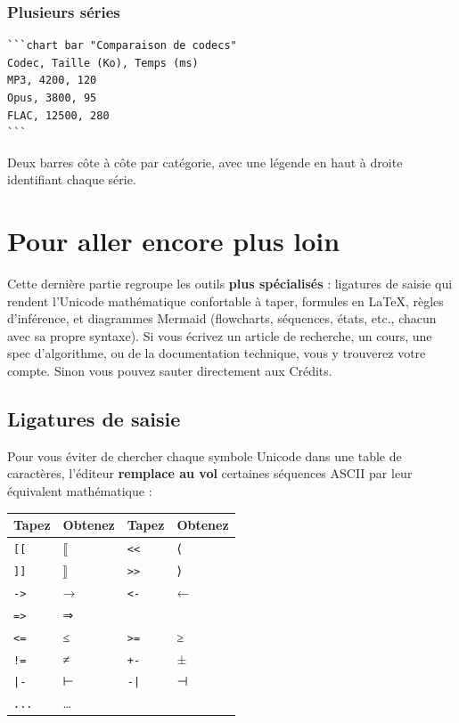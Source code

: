 \documentclass[11pt,a4paper]{article}
\theoremstyle{definition}
\begin{document}
\subsubsection{Plusieurs séries}

\begin{lstlisting}
```chart bar "Comparaison de codecs"
Codec, Taille (Ko), Temps (ms)
MP3, 4200, 120
Opus, 3800, 95
FLAC, 12500, 280
```
\end{lstlisting}


Deux barres côte à côte par catégorie, avec une légende en haut à
droite identifiant chaque série.



\noindent\hrulefill\par


\section{Pour aller encore plus loin}

Cette dernière partie regroupe les outils \textbf{plus spécialisés} :
ligatures de saisie qui rendent l'Unicode mathématique confortable à
taper, formules en LaTeX, règles d'inférence, et diagrammes Mermaid
(flowcharts, séquences, états, etc., chacun avec sa propre syntaxe).
Si vous écrivez un article de recherche, un cours, une spec
d'algorithme, ou de la documentation technique, vous y trouverez votre
compte. Sinon vous pouvez sauter directement aux Crédits.


\subsection{Ligatures de saisie}

Pour vous éviter de chercher chaque symbole Unicode dans une table de
caractères, l'éditeur \textbf{remplace au vol} certaines séquences ASCII
par leur équivalent mathématique :


\begin{tabularx}{\textwidth}{>{\raggedright\arraybackslash}X>{\raggedright\arraybackslash}X>{\raggedright\arraybackslash}X>{\raggedright\arraybackslash}X}
  \toprule
  Tapez & Obtenez & Tapez & Obtenez \\
  \midrule
  \texttt{[[} & ⟦ & \texttt{<<} & ⟨ \\
  \texttt{]]} & ⟧ & \texttt{>>} & ⟩ \\
  \texttt{->} & → & \texttt{<-} & ← \\
  \texttt{=>} & ⇒ &  &  \\
  \texttt{<=} & ≤ & \texttt{>=} & ≥ \\
  \texttt{!=} & ≠ & \texttt{+-} & ± \\
  \texttt{|-} & ⊢ & \texttt{-|} & ⊣ \\
  \texttt{...} & … &  &  \\
  \bottomrule
\end{tabularx}
\end{document}
